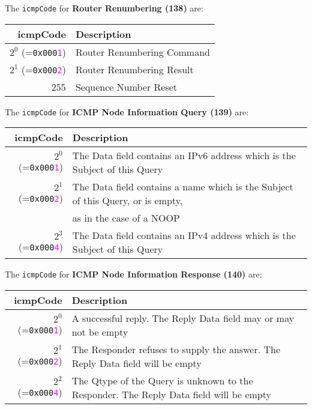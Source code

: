 \documentclass[documentation]{subfiles}
\begin{document}
The {\tt icmpCode} for {\bf Router Renumbering (138)} are:
\begin{longtable}{rl}
    \toprule
    {\bf icmpCode} & {\bf Description}\\
    \midrule\endhead%
    $2^{0}$ (={\tt 0x000\textcolor{magenta}{1}}) & Router Renumbering Command\\
    $2^{1}$ (={\tt 0x000\textcolor{magenta}{2}}) & Router Renumbering Result\\
    255 & Sequence Number Reset\\
    \bottomrule
\end{longtable}

The {\tt icmpCode} for {\bf ICMP Node Information Query (139)} are:
\begin{longtable}{rl}
    \toprule
    {\bf icmpCode} & {\bf Description}\\
    \midrule\endhead%
    $2^{0}$ (={\tt 0x000\textcolor{magenta}{1}}) & The Data field contains an IPv6 address which is the Subject of this Query\\
    $2^{1}$ (={\tt 0x000\textcolor{magenta}{2}}) & The Data field contains a name which is the Subject of this Query, or is empty,\\
                                                 & as in the case of a NOOP\\
    $2^{3}$ (={\tt 0x000\textcolor{magenta}{4}}) & The Data field contains an IPv4 address which is the Subject of this Query\\
    \bottomrule
\end{longtable}

The {\tt icmpCode} for {\bf ICMP Node Information Response (140)} are:
\begin{longtable}{rl}
    \toprule
    {\bf icmpCode} & {\bf Description}\\
    \midrule\endhead%
    $2^{0}$ (={\tt 0x000\textcolor{magenta}{1}}) & A successful reply. The Reply Data field may or may not be empty\\
    $2^{1}$ (={\tt 0x000\textcolor{magenta}{2}}) & The Responder refuses to supply the answer. The Reply Data field will be empty\\
    $2^{2}$ (={\tt 0x000\textcolor{magenta}{4}}) & The Qtype of the Query is unknown to the Responder. The Reply Data field will be empty\\
    \bottomrule
\end{longtable}
\end{document}
